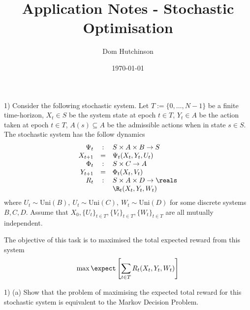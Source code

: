 \documentclass[11pt,a4paper]{article}
\begin{document}

\title{Application Notes - Stochastic Optimisation}
\author{Dom Hutchinson}
\date{\today}
\maketitle


\begin{question}{1)}
  Consider the following stochastic system. Let $T:=\{0,\dots,N-1\}$ be a finite time-horizon, $X_t\in S$ be the system state at epoch $t\in T$, $Y_t\in A$ be the action taken at epoch $t\in T$, $A(s)\subseteq A$ be the admissible actions when in state $s\in S$. The stochastic system has the follow dynamics
  \[\begin{array}{rcl}
    \Psi_t&:&S\times A\times B\to S\\
    X_{t+1}&=&\Psi_t(X_t,Y_t,U_t)\\
    \Phi_t&:&S\times C\to A\\
    Y_{t+1}&=&\Phi_t(X_t,V_t)\\
    R_t&:&S\times A\times D\to \reals\\
    &&\R_t(X_t,Y_t,W_t)\\
  \end{array}\]
  where $U_t\sim\text{Uni}(B),\ U_t\sim\text{Uni}(C),\ W_t\sim\text{Uni}(D)$ for some discrete systems $B,C,D$. Assume that $X_0,\{U_t\}_{t\in T},\{V_t\}_{t\in T},\{W_t\}_{t\in T}$ are all mutually independent.
  \par The objective of this task is to maximised the total expected reward from this system
  \[ \max\expect\left[\sum_{t\in T}R_t(X_t,Y_t,W_t)\right] \]
\end{question}

\begin{question}{1) (a)}
  Show that the problem of maximising the expected total reward for this stochastic system is equivalent to the Markov Decision Problem.
\end{question}
\end{document}
